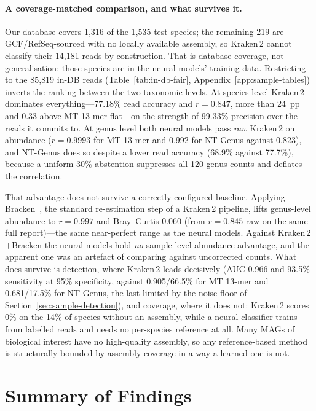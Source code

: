 \paragraph{A coverage-matched comparison, and what survives it.}
Our database covers 1{,}316 of the 1{,}535 test species; the remaining 219 are
GCF/RefSeq-sourced with no locally available assembly, so Kraken\,2 cannot classify
their 14{,}181 reads by construction. That is database coverage, not generalisation:
those species are in the neural models' training data. Restricting to the 85{,}819
in-DB reads (Table~\ref{tab:in-db-fair}, Appendix~\ref{app:sample-tables}) inverts the
ranking between the two taxonomic levels. At species level Kraken\,2 dominates
everything---77.18\% read accuracy and $r = 0.847$, more than 24~pp and 0.33 above MT
13-mer flat---on the strength of 99.33\% precision over the reads it commits to. At
genus level both neural models pass \emph{raw} Kraken\,2 on abundance ($r = 0.9993$
for MT 13-mer and 0.992 for NT-Genus against 0.823), and NT-Genus does so despite a
lower read accuracy (68.9\% against 77.7\%), because a uniform 30\% abstention
suppresses all 120 genus counts and deflates the correlation.

That advantage does not survive a correctly configured baseline. Applying
Bracken~\cite{Lu2017}, the standard re-estimation step of a Kraken\,2 pipeline, lifts
genus-level abundance to $r = 0.997$ and Bray--Curtis 0.060 (from $r = 0.845$ raw on
the same full report)---the same near-perfect range as the neural models. Against
Kraken\,2$+$Bracken the neural models hold \emph{no} sample-level abundance advantage,
and the apparent one was an artefact of comparing against uncorrected counts. What
does survive is detection, where Kraken\,2 leads decisively (AUC 0.966 and 93.5\%
sensitivity at 95\% specificity, against 0.905/66.5\% for MT 13-mer and 0.681/17.5\%
for NT-Genus, the last limited by the noise floor of
Section~\ref{sec:sample-detection}), and coverage, where it does not: Kraken\,2 scores
0\% on the 14\% of species without an assembly, while a neural classifier trains from
labelled reads and needs no per-species reference at all. Many MAGs of biological
interest have no high-quality assembly, so any reference-based method is structurally
bounded by assembly coverage in a way a learned one is not.

\section{Summary of Findings}

